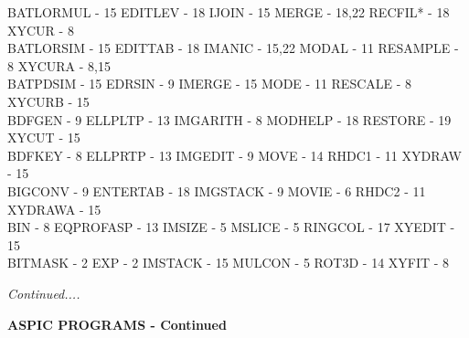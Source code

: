 {\begin{tabbing}
 BATLORMUL - 15                          \>EDITLEV - 18                          
   \>IJOIN - 15                              \>
 MERGE - 18,22                           \>RECFIL* - 18                          
   \>XYCUR - 8                               \\
 BATLORSIM - 15                          \>EDITTAB - 18                          
   \>IMANIC - 15,22                          \>
 MODAL - 11                              \>RESAMPLE - 8                          
   \>XYCURA - 8,15                           \\
 BATPDSIM - 15                           \>EDRSIN - 9                            
   \>IMERGE - 15                             \>
 MODE - 11                               \>RESCALE - 8                           
   \>XYCURB - 15                             \\
 BDFGEN - 9                              \>ELLPLTP - 13                          
   \>IMGARITH - 8                            \>
 MODHELP - 18                            \>RESTORE - 19                          
   \>XYCUT - 15                              \\
 BDFKEY - 8                              \>ELLPRTP - 13                          
   \>IMGEDIT - 9                             \>
 MOVE - 14                               \>RHDC1 - 11                            
   \>XYDRAW - 15                             \\
 BIGCONV - 9                             \>ENTERTAB - 18                         
   \>IMGSTACK - 9                            \>
 MOVIE - 6                               \>RHDC2 - 11                            
   \>XYDRAWA - 15                            \\
 BIN - 8                                 \>EQPROFASP - 13                        
   \>IMSIZE - 5                              \>
 MSLICE - 5                              \>RINGCOL - 17                          
   \>XYEDIT - 15                             \\
 BITMASK - 2                             \>EXP - 2                               
   \>IMSTACK - 15                            \>
 MULCON - 5                              \>ROT3D - 14                            
   \>XYFIT - 8                               \\
\end{tabbing}
\vspace{20mm}
{\em Continued....}

\newpage
\begin{center}
{\Large\bf ASPIC PROGRAMS - Continued}
\end{center}

}
